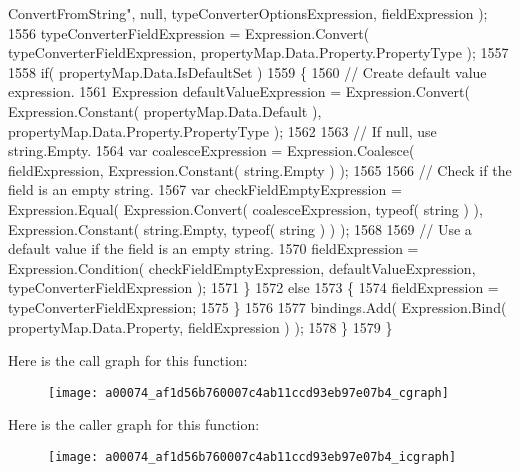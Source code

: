 \begin{DoxyCode}
{      ConvertFromString"}, null, typeConverterOptionsExpression, fieldExpression );
1556                 typeConverterFieldExpression = Expression.Convert( typeConverterFieldExpression, 
      propertyMap.Data.Property.PropertyType );
1557 
1558                 \textcolor{keywordflow}{if}( propertyMap.Data.IsDefaultSet )
1559                 \{
1560                     \textcolor{comment}{// Create default value expression.}
1561                     Expression defaultValueExpression = Expression.Convert( Expression.Constant( 
      propertyMap.Data.Default ), propertyMap.Data.Property.PropertyType );
1562 
1563                     \textcolor{comment}{// If null, use string.Empty.}
1564                     var coalesceExpression = Expression.Coalesce( fieldExpression, Expression.Constant( 
      string.Empty ) );
1565 
1566                     \textcolor{comment}{// Check if the field is an empty string.}
1567                     var checkFieldEmptyExpression = Expression.Equal( Expression.Convert( 
      coalesceExpression, typeof( \textcolor{keywordtype}{string} ) ), Expression.Constant( \textcolor{keywordtype}{string}.Empty, typeof( \textcolor{keywordtype}{string} ) ) );
1568 
1569                     \textcolor{comment}{// Use a default value if the field is an empty string.}
1570                     fieldExpression = Expression.Condition( checkFieldEmptyExpression, 
      defaultValueExpression, typeConverterFieldExpression );
1571                 \}
1572                 \textcolor{keywordflow}{else}
1573                 \{
1574                     fieldExpression = typeConverterFieldExpression;
1575                 \}
1576 
1577                 bindings.Add( Expression.Bind( propertyMap.Data.Property, fieldExpression ) );
1578             \}
1579         \}
\end{DoxyCode}


Here is the call graph for this function\-:
\nopagebreak
\begin{figure}[H]
\begin{center}
\leavevmode
\texttt{[image: a00074\_af1d56b760007c4ab11ccd93eb97e07b4\_cgraph]}
\end{center}
\end{figure}




Here is the caller graph for this function\-:
\nopagebreak
\begin{figure}[H]
\begin{center}
\leavevmode
\texttt{[image: a00074\_af1d56b760007c4ab11ccd93eb97e07b4\_icgraph]}
\end{center}
\end{figure}


